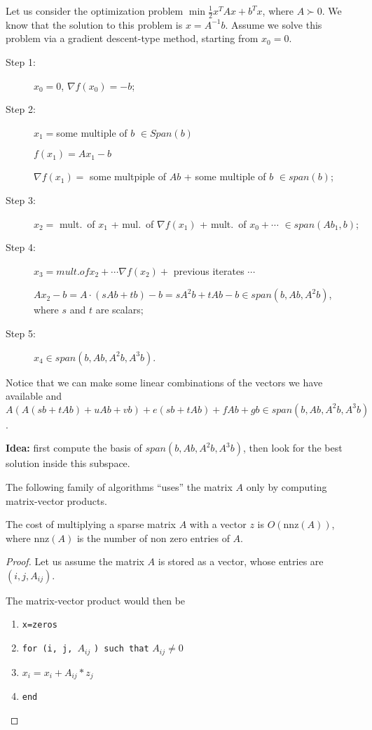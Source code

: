 \documentclass[computationalMathematics.tex]{subfiles}
\begin{document}
\begin{example}
  Let us consider the optimization problem $\min \frac{1}{2}x^T A x + b^T x $, where $A \succ 0$. We know that the solution to this problem is $x=A^{-1}b$. Assume we solve this problem via a gradient descent-type method, starting from $x_0=0$.
  \begin{description}
    \item[{\sc Step 1:}] $x_0 = 0$, $\nabla f(x_0) = -b$;
    \item[{\sc Step 2:}] $x_1 = $some multiple of $b$ $\in Span(b)$
      
      $f(x_1) = Ax_1 - b$

      $\nabla f(x_1) = $ some multpiple of $Ab$ + some multiple of $b$ $\in span(b)$;
    \item[{\sc Step 3:}] $x_2 = $ mult.~of $x_1$ + mul.~of $\nabla f(x_1)$ + mult.~of $x_0 + \cdots $ $\in span(Ab_1, b)$;
    \item[{\sc Step 4:}] $x_3 = mult. of x_2 + \cdots \nabla f(x_2) + $ previous iterates $\cdots$

      $Ax_2 - b = A \cdot (sAb + tb) - b= s A^2 b + tAb -b \in span(b, Ab, A^2b)$, where $s$ and $t$ are scalars;
    \item[{\sc Step 5:}] $x_4 \in span(b, Ab, A^2b, A^3b)$.
  \end{description}
  Notice that we can make some linear combinations of the vectors we have available and $A(A(sb + tAb) +uAb + vb) + e(sb + tAb) + fAb+gb \in span(b, Ab, A^2b, A^3b)$.
\end{example}

  \textbf{Idea:} first compute the basis of $span(b, Ab, A^2b, A^3b)$, then look for the best solution inside this subspace.

The following family of algorithms ``uses'' the matrix $A$ only by computing matrix-vector products.

\begin{obs}
  The cost of multiplying a sparse matrix $A$ with a vector $z$ is $O(\text{nnz}(A))$, where $\text{nnz}(A)$ is the number of non zero entries of $A$.
\end{obs}

\begin{proof}
  Let us assume the matrix $A$ is stored as a vector, whose entries are $(i, j, A_{ij})$.

  The matrix-vector product would then be
  \begin{enumerate}
    \item \texttt{x=zeros}
    \item \texttt{for (i, j, }$A_{ij}$ \texttt{) such that} $A_{ij} \neq 0$
    \item $x_i = x_i + A_{ij} * z_j$
    \item \texttt{end}
  \end{enumerate}
\end{proof}
\end{document}
